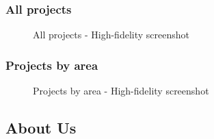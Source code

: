 \documentclass[11pt, letterpaper]{article}
\begin{document}
\subsubsection*{All projects}
\begin{figure}[H]
    \centering
    \setlength{\fboxsep}{0pt}
    \caption{All projects - High-fidelity screenshot}
    \label{fig:PageScreenshot_All_projects}
\end{figure}

\subsubsection*{Projects by area}
\begin{figure}[H]
    \centering
    \setlength{\fboxsep}{0pt}
    \caption{Projects by area - High-fidelity screenshot}
    \label{fig:PageScreenshot_Projects_by_area}
\end{figure}

\subsection{About Us}
\end{document}
